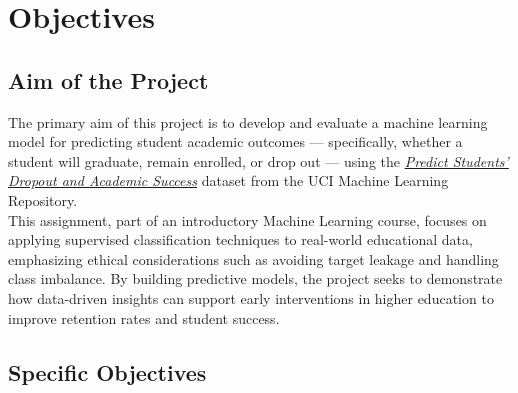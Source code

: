 \documentclass[twoside,final]{hcmut-report}
\begin{document}
\fancyfoot{}
\coverpage\clearpage

\tableofcontents
\listoffigures
\clearpage

\setcounter{page}{1}

\section{Objectives}

\subsection*{Aim of the Project}

The primary aim of this project is to develop and evaluate a machine learning model for predicting student academic outcomes — specifically, whether a student will graduate, remain enrolled, or drop out — using the \href{https://archive.ics.uci.edu/dataset/697/predict+students+dropout+and+academic+success}{\textit{Predict Students' Dropout and Academic Success}} dataset from the UCI Machine Learning Repository.\\

This assignment, part of an introductory Machine Learning course, focuses on applying supervised classification techniques to real-world educational data, emphasizing ethical considerations such as avoiding target leakage and handling class imbalance. By building predictive models, the project seeks to demonstrate how data-driven insights can support early interventions in higher education to improve retention rates and student success.

\subsection*{Specific Objectives}
\end{document}
